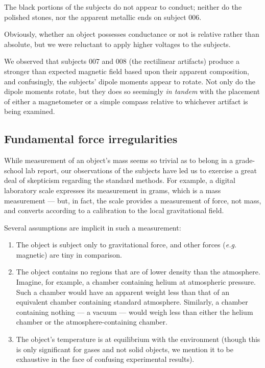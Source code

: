 \documentclass[10pt]{article}
\theoremstyle{definition}
\begin{document}
The black portions of the subjects do not appear to conduct; neither do the polished stones, nor the apparent metallic ends on subject 006.

Obviously, whether an object possesses conductance or not is relative rather than absolute, but we were reluctant to apply higher voltages to the subjects.

We observed that subjects 007 and 008 (the rectilinear artifacts) produce a stronger than expected magnetic field based upon their apparent composition, and confusingly, the subjects' dipole moments appear to rotate.
Not only do the dipole moments rotate, but they does so seemingly \textit{in tandem} with the placement of either a magnetometer or a simple compass relative to whichever artifact is being examined.

\subsection{Fundamental force irregularities}
While measurement of an object's mass seems so trivial as to belong in a grade-school lab report, our observations of the subjects have led us to exercise a great deal of skepticism regarding the standard methods.
For example, a digital laboratory scale expresses its measurement in grams, which is a mass measurement --- but, in fact, the scale provides a measurement of force, not mass, and converts according to a calibration to the local gravitational field.

Several assumptions are implicit in such a measurement:
\begin{enumerate}
\item The object is subject only to gravitational force, and other forces (\textit{e.g.} magnetic) are tiny in comparison.
\item The object contains no regions that are of lower density than the atmosphere. Imagine, for example, a chamber containing helium at atmospheric pressure. Such a chamber would have an apparent weight less than that of an equivalent chamber containing standard atmosphere. Similarly, a chamber containing nothing --- a vacuum --- would weigh less than either the helium chamber or the atmosphere-containing chamber.
\item The object's temperature is at equilibrium with the environment (though this is only significant for gases and not solid objects, we mention it to be exhaustive in the face of confusing experimental results).
\end{enumerate}
\end{document}
